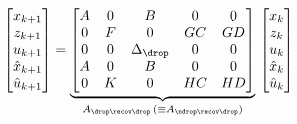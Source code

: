 %
\begin{equation}
    \begin{bmatrix}
        x_{k+1} \\
        z_{k+1} \\
        u_{k+1} \\
        \hat x_{k+1} \\
        \hat u_{k+1}
    \end{bmatrix} = \underbrace{\begin{bmatrix}
        A & 0 & B & 0 & 0 \\
        0 & F & 0 & GC & GD \\
        0 & 0 & \Delta_\drop & 0 & 0 \\
        A & 0 & B & 0 & 0 \\
        0 & K & 0 & HC & HD \\
    \end{bmatrix}}_{A_{\drop\recov\drop}\, (\equiv A_{\ndrop\recov\drop})}\, \begin{bmatrix}
        x_{k} \\
        z_{k} \\
        u_{k} \\
        \hat x_{k} \\
        \hat u_{k}
    \end{bmatrix}
\end{equation}

